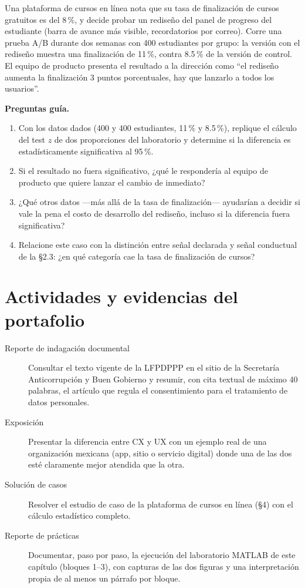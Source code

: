 \begin{casoFicticio}
Una plataforma de cursos en línea nota que su tasa de finalización de
cursos gratuitos es del 8\,\%, y decide probar un rediseño del panel de
progreso del estudiante (barra de avance más visible, recordatorios por
correo). Corre una prueba A/B durante dos semanas con 400 estudiantes por
grupo: la versión con el rediseño muestra una finalización de 11\,\%, contra
8.5\,\% de la versión de control. El equipo de producto presenta el
resultado a la dirección como \enquote{el rediseño aumenta la finalización 3
puntos porcentuales, hay que lanzarlo a todos los usuarios}.

\textbf{Preguntas guía.}
\begin{enumerate}
  \item Con los datos dados (400 y 400 estudiantes, 11\,\% y 8.5\,\%),
  replique el cálculo del test $z$ de dos proporciones del laboratorio y
  determine si la diferencia es estadísticamente significativa al 95\,\%.
  \item Si el resultado no fuera significativo, ¿qué le respondería al
  equipo de producto que quiere lanzar el cambio de inmediato?
  \item ¿Qué otros datos —más allá de la tasa de finalización— ayudarían a
  decidir si vale la pena el costo de desarrollo del rediseño, incluso si la
  diferencia fuera significativa?
  \item Relacione este caso con la distinción entre señal declarada y señal
  conductual de la §2.3: ¿en qué categoría cae la tasa de finalización de
  cursos?
\end{enumerate}
\end{casoFicticio}

\section{Actividades y evidencias del portafolio}

\begin{description}
  \item[Reporte de indagación documental] Consultar el texto vigente de la
  LFPDPPP en el sitio de la Secretaría Anticorrupción y Buen Gobierno y
  resumir, con cita textual de máximo 40 palabras, el artículo que regula el
  consentimiento para el tratamiento de datos personales.
  \item[Exposición] Presentar la diferencia entre CX y UX con un ejemplo real
  de una organización mexicana (app, sitio o servicio digital) donde una de
  las dos esté claramente mejor atendida que la otra.
  \item[Solución de casos] Resolver el estudio de caso de la plataforma de
  cursos en línea (§4) con el cálculo estadístico completo.
  \item[Reporte de prácticas] Documentar, paso por paso, la ejecución del
  laboratorio MATLAB de este capítulo (bloques 1--3), con capturas de las
  dos figuras y una interpretación propia de al menos un párrafo por bloque.
\end{description}

